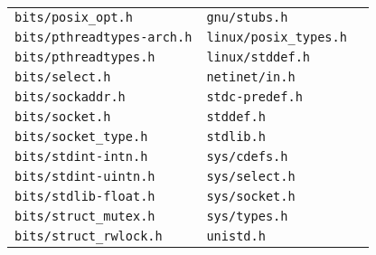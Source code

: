 \begin{longtable}{l l l }
\texttt{bits/posix\_opt.h} & \texttt{gnu/stubs.h} \\
\texttt{bits/pthreadtypes-arch.h} & \texttt{linux/posix\_types.h} \\
\texttt{bits/pthreadtypes.h} & \texttt{linux/stddef.h} \\
\texttt{bits/select.h} & \texttt{netinet/in.h} \\
\texttt{bits/sockaddr.h} & \texttt{stdc-predef.h} \\
\texttt{bits/socket.h} & \texttt{stddef.h} \\
\texttt{bits/socket\_type.h} & \texttt{stdlib.h} \\
\texttt{bits/stdint-intn.h} & \texttt{sys/cdefs.h} \\
\texttt{bits/stdint-uintn.h} & \texttt{sys/select.h} \\
\texttt{bits/stdlib-float.h} & \texttt{sys/socket.h} \\
\texttt{bits/struct\_mutex.h} & \texttt{sys/types.h} \\
\texttt{bits/struct\_rwlock.h} & \texttt{unistd.h} \\
\end{longtable}
